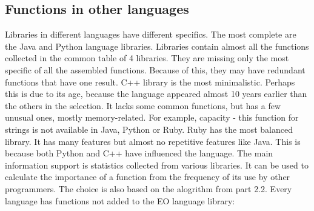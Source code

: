 \documentclass[11pt,nonacm,natbib=false]{acmart}
\begin{document}
\subsection{Functions in other languages}
Libraries in different languages have different specifics. The most complete are the Java and Python language libraries. Libraries contain almost all the functions collected in the common table of 4 libraries. They are missing only the most specific of all the assembled functions. Because of this, they may have redundant functions that have one result. C++ library is the most minimalistic. Perhaps this is due to its age, because the language appeared almost 10 years earlier than the others in the selection. It lacks some common functions, but has a few unusual ones, mostly memory-related. For example, capacity - this function for strings is not available in Java, Python or Ruby. Ruby has the most balanced library. It has many features but almost no repetitive features like Java. This is because both Python and C++ have influenced the language.
The main information support is statistics collected from various libraries.  It can be used to calculate the importance of a function from the frequency of its use by other programmers. The choice is also based on the alogrithm from part 2.2. Every language has functions not added to the EO language library:
\end{document}
